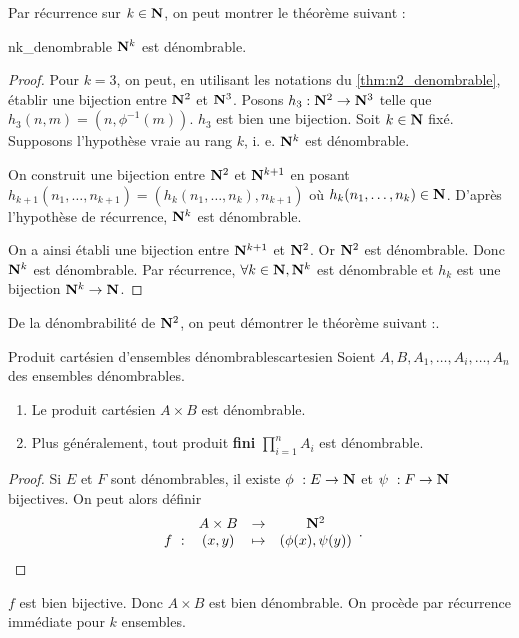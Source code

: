\documentclass[a4paper,french,final]{memoir}
\begin{document}
Par récurrence sur $k \in \mathbf{N}$, on peut montrer le théorème suivant :
\begin{theoremb}{}{nk_denombrable}
    $\mathbf{N}^k$ est dénombrable.
\end{theoremb}

\begin{proof}

  Pour $k = 3$, on peut, en utilisant les notations du \cref{thm:n2_denombrable}, établir une bijection entre $\mathbf{N}^2$ et $\mathbf{N}^3$. Posons $h_3 : \mathbf{N}^2 \to \mathbf{N}^3$ telle que $h_3(n,m) = (n,\phi^{-1}(m))$. $h_3$ est bien une bijection. Soit $k \in \mathbf{N}$ fixé. Supposons l'hypothèse vraie au rang $k$, i. e. $\mathbf{N}^k$ est dénombrable.

  On construit une bijection entre $\mathbf{N}^2$ et $\mathbf{N}^{k+1}$ en posant $h_{k+1}(n_1, \dots, n_{k+1}) = (h_k(n_1, \dots, n_k),n_{k+1})$ où $h_k(n_1, \dots, n_k) \in \mathbf{N}$. D'après l'hypothèse de récurrence, $\mathbf{N}^k$ est dénombrable.

  On a ainsi établi une bijection entre $\mathbf{N}^{k+1}$ et $\mathbf{N}^2$. Or $\mathbf{N}^2$ est dénombrable. Donc $\mathbf{N}^k$ est dénombrable. Par récurrence, $\forall k \in \mathbf{N}, \mathbf{N}^k$ est dénombrable et $h_k$ est une bijection $\mathbf{N}^k \to \mathbf{N}$.

\end{proof}
De la dénombrabilité de $\mathbf{N}^2$, on peut démontrer le théorème suivant :.
\begin{theoremb}{Produit cartésien d'ensembles dénombrables}{cartesien}
	Soient $A, B, A_1, \dots, A_i, \dots, A_n$ des ensembles dénombrables.
	\begin{enumerate}
		\item Le produit cartésien $A \times B$ est dénombrable.
		\item Plus généralement, tout produit \textbf{fini} $\prod_{i=1}^{n} A_i $ est dénombrable.
	\end{enumerate}
\end{theoremb}
\begin{proof}
	Si $E$ et $F$ sont dénombrables, il existe $\phi~: E \to \NN$ et $\psi~: F \to \mathbf{N}$ bijectives. On peut alors définir \[ \begin{array}{cccc}
	\ & A \times B & \to & \NN^2 \\
	f~: & (x,y) & \mapsto & (\phi(x), \psi(y))
	\end{array}.\]

\end{proof}

$f $ est bien bijective. Donc $A \times B$ est bien dénombrable. On procède par récurrence immédiate pour $k$ ensembles.
\end{document}
